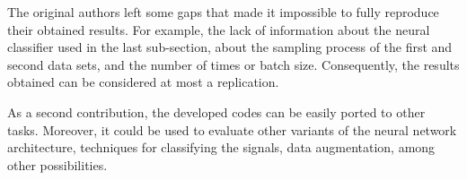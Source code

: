 The original authors left some gaps that made it impossible to fully reproduce their obtained results. For example, the lack of information about the neural classifier used in the last sub-section, about the sampling process of the first and second data sets, and the number of times or batch size. Consequently, the results obtained can be considered at most a replication.

As a second contribution, the developed codes can be easily ported to other tasks. Moreover, it could be used to evaluate other variants of the neural network architecture, techniques for classifying the signals, data augmentation, among other possibilities.  



